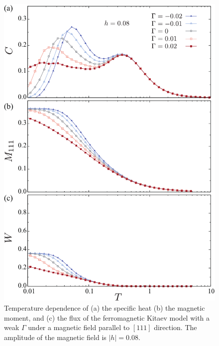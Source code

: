 \documentclass[reprint,amsmath,amssymb,aps,prx]{revtex4-2}
\begin{document}
\begin{figure}
  \begin{center}
    \includegraphics[width=0.9\linewidth]{plot_CMF_h0.08_G.pdf}
  \end{center}
  \caption{Temperature dependence of (a) the specific heat (b) the magnetic moment, and (c) the flux of the ferromagnetic Kitaev model with a weak $\Gamma$ under a magnetic field parallel to $[111]$ direction. The amplitude of the magnetic field is $|h|=0.08$.}
  \label{fig:CMF_h0.08_G}
\end{figure}
\end{document}
